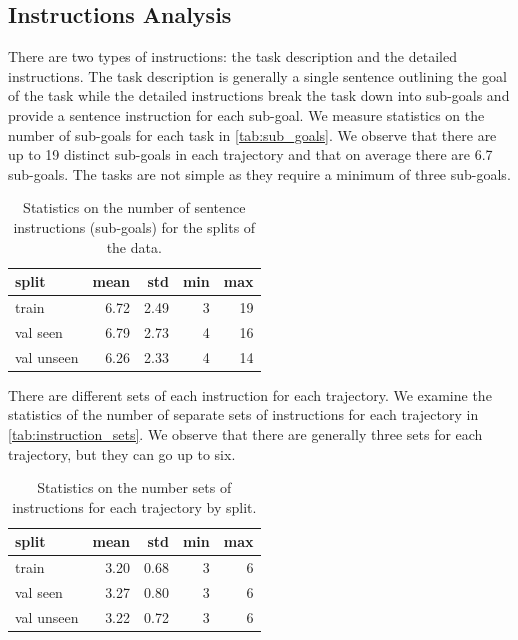 \documentclass[11pt,a4paper]{article}
\begin{document}
\subsection{Instructions Analysis}
There are two types of instructions: the task description and the detailed instructions. The task description is generally a single sentence outlining the goal of the task while the detailed instructions break the task down into sub-goals and provide a sentence instruction for each sub-goal. We measure statistics on the number of sub-goals for each task in \autoref{tab:sub_goals}. We observe that there are up to 19 distinct sub-goals in each trajectory and that on average there are 6.7 sub-goals. The tasks are not simple as they require a minimum of three sub-goals.

\begin{table}[]
    \centering
\begin{tabular}{lrrrr}
\toprule
     split &  mean &  std &  min &  max \\
\midrule
     train &  6.72 & 2.49 &    3 &   19 \\
  val seen &  6.79 & 2.73 &    4 &   16 \\
val unseen &  6.26 & 2.33 &    4 &   14 \\
\bottomrule
\end{tabular}
    \caption{Statistics on the number of sentence instructions (sub-goals) for the splits of the data.}
    \label{tab:sub_goals}
\end{table}


There are different sets of each instruction for each trajectory. We examine the statistics of the number of separate sets of instructions for each trajectory in \autoref{tab:instruction_sets}. We observe that there are generally three sets for each trajectory, but they can go up to six.

\begin{table}[]
    \centering
    \begin{tabular}{lrrrr}
    \toprule
         split &  mean &  std &  min &  max \\
    \midrule
         train &  3.20 & 0.68 &    3 &    6 \\
      val seen &  3.27 & 0.80 &    3 &    6 \\
    val unseen &  3.22 & 0.72 &    3 &    6 \\
    \bottomrule
    \end{tabular}
    \caption{Statistics on the number sets of instructions for each trajectory by split.}
    \label{tab:instruction_sets}
\end{table}
\end{document}
